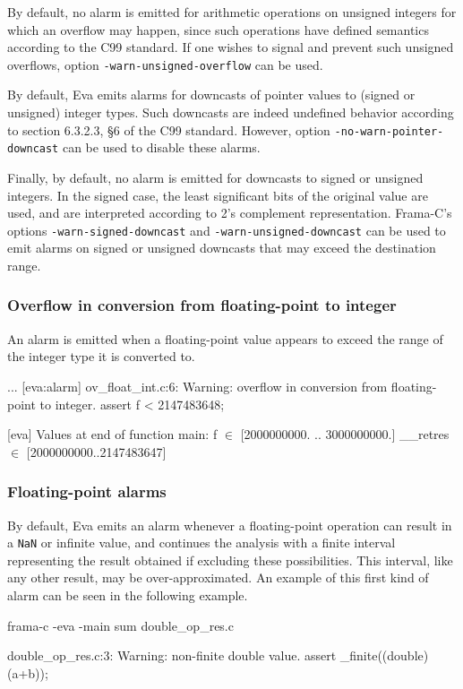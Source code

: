 \documentclass[web]{frama-c-book}
\newcommand{\isoc}{\textsf{C99}}
\newcommand{\Eva}{\textsf{Eva}}
\begin{document}
By default, no alarm is emitted for arithmetic operations on unsigned integers
for which an overflow may happen, since such operations have
defined semantics according to the \isoc{} standard.
If one wishes to signal and prevent such unsigned overflows,
option \verb+-warn-unsigned-overflow+ can be used.

By default, Eva emits alarms for downcasts of pointer values to (signed
or unsigned) integer types. Such downcasts are indeed  undefined behavior
according to section 6.3.2.3, §6 of the \isoc{} standard.
However, option \lstinline|-no-warn-pointer-downcast| can be used to disable
these alarms.

Finally, by default, no alarm is emitted for downcasts to signed or unsigned
integers. In the signed case, the least significant bits
of the original value are used, and are interpreted according
to 2's complement representation.
Frama-C's options \lstinline|-warn-signed-downcast| and
\lstinline|-warn-unsigned-downcast| can be used to emit alarms on signed
or unsigned downcasts that may exceed the destination range.


\subsubsection{Overflow in conversion from floating-point to integer}
An alarm is emitted when a floating-point value appears to exceed the
range of the integer type it is converted to.

\begin{logs}
...
[eva:alarm] ov_float_int.c:6: Warning: overflow in conversion from floating-point 
 to integer. assert f < 2147483648;

[eva] Values at end of function main:
f $\in$ [2000000000. .. 3000000000.]
__retres $\in$ [2000000000..2147483647]
\end{logs}

\subsubsection{Floating-point alarms}

By default, \Eva{} emits an alarm whenever a floating-point operation can result
in a \lstinline|NaN| or infinite value, and continues the analysis
with a finite interval representing the result obtained
if excluding these possibilities. This interval, like
any other result, may be over-approximated. An example of this
first kind of alarm can be seen in the following example.
\begin{shell}
frama-c -eva -main sum double_op_res.c
\end{shell}
\begin{logs}
 double_op_res.c:3: Warning: non-finite double value.
    assert \is_finite((double)(a+b));
\end{logs}
\end{document}
